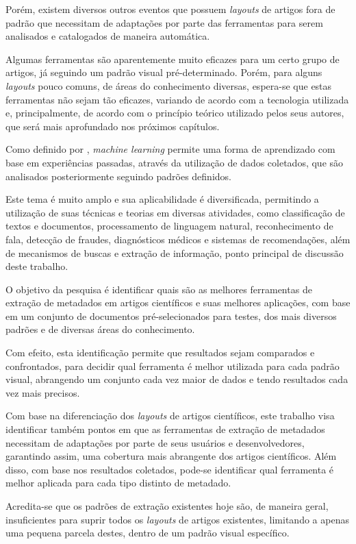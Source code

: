 Porém, existem diversos outros eventos que possuem \textit{layouts} de artigos fora de padrão que necessitam de adaptações por parte das ferramentas para serem analisados e catalogados de maneira automática. 

Algumas ferramentas são aparentemente muito eficazes para um certo grupo de artigos, já seguindo um padrão visual pré-determinado. Porém, para alguns \textit{layouts} pouco comuns, de áreas do conhecimento diversas, espera-se que estas ferramentas não sejam tão eficazes, variando de acordo com a tecnologia utilizada e, principalmente, de acordo com o princípio teórico utilizado pelos seus autores, que será mais aprofundado nos próximos capítulos.

Como definido por \cite{foundations-machine-learning}, \textit{machine learning} permite uma forma de aprendizado com base em experiências passadas, através da utilização de dados coletados, que são analisados posteriormente seguindo padrões definidos.

Este tema é muito amplo e sua aplicabilidade é diversificada, permitindo a utilização de suas técnicas e teorias em diversas atividades, como classificação de textos e documentos, processamento de linguagem natural, reconhecimento de fala, detecção de fraudes, diagnósticos médicos e sistemas de recomendações, além de mecanismos de buscas e extração de informação, ponto principal de discussão deste trabalho.

O objetivo da pesquisa é identificar quais são as melhores ferramentas de extração de metadados em artigos científicos e suas melhores aplicações, com base em um conjunto de documentos pré-selecionados para testes, dos mais diversos padrões e de diversas áreas do conhecimento.

Com efeito, esta identificação permite que resultados sejam comparados e confrontados, para decidir qual ferramenta é melhor utilizada para cada padrão visual, abrangendo um conjunto cada vez maior de dados e tendo resultados cada vez mais precisos.

Com base na diferenciação dos \textit{layouts} de artigos científicos, este trabalho visa identificar também pontos em que as ferramentas de extração de metadados necessitam de adaptações por parte de seus usuários e desenvolvedores, garantindo assim, uma cobertura mais abrangente dos artigos científicos. Além disso, com base nos resultados coletados, pode-se identificar qual ferramenta é melhor aplicada para cada tipo distinto de metadado.

Acredita-se que os padrões de extração existentes hoje são, de maneira geral, insuficientes para suprir todos os \emph{layouts} de artigos existentes, limitando a apenas uma pequena parcela destes, dentro de um padrão visual específico.

